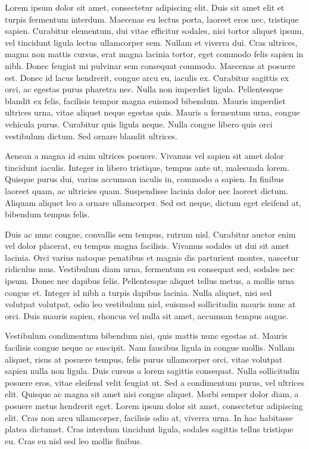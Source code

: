 \documentclass[a4paper,12pt]{report}
\begin{document}
\begin{multicols}{2}
  	\setlength{\columnseprule}{2pt} %
	\setlength{\columnsep}{1cm} %
	\noindent

  Lorem ipsum dolor sit amet, consectetur adipiscing elit. Duis sit amet elit et turpis fermentum interdum. Maecenas eu lectus porta, laoreet eros nec, tristique sapien. Curabitur elementum, dui vitae efficitur sodales, nisi tortor aliquet ipsum, vel tincidunt ligula lectus ullamcorper sem. Nullam et viverra dui. Cras ultrices, magna non mattis cursus, erat magna lacinia tortor, eget commodo felis sapien in nibh. Donec feugiat mi pulvinar sem consequat commodo. Maecenas at posuere est. Donec id lacus hendrerit, congue arcu eu, iaculis ex. Curabitur sagittis ex orci, ac egestas purus pharetra nec. Nulla non imperdiet ligula. Pellentesque blandit ex felis, facilisis tempor magna euismod bibendum. Mauris imperdiet ultrices urna, vitae aliquet neque egestas quis. Mauris a fermentum urna, congue vehicula purus. Curabitur quis ligula neque. Nulla congue libero quis orci vestibulum dictum. Sed ornare blandit ultrices.

  Aenean a magna id enim ultrices posuere. Vivamus vel sapien sit amet dolor tincidunt iaculis. Integer in libero tristique, tempus ante ut, malesuada lorem. Quisque purus dui, varius accumsan iaculis in, commodo a sapien. In finibus laoreet quam, ac ultricies quam. Suspendisse lacinia dolor nec laoreet dictum. Aliquam aliquet leo a ornare ullamcorper. Sed est neque, dictum eget eleifend at, bibendum tempus felis.


Duis ac nunc congue, convallis sem tempus, rutrum nisl. Curabitur auctor enim vel dolor placerat, eu tempus magna facilisis. Vivamus sodales ut dui sit amet lacinia. Orci varius natoque penatibus et magnis dis parturient montes, nascetur ridiculus mus. Vestibulum diam urna, fermentum eu consequat sed, sodales nec ipsum. Donec nec dapibus felis. Pellentesque aliquet tellus metus, a mollis urna congue et. Integer id nibh a turpis dapibus lacinia. Nulla aliquet, nisi sed volutpat volutpat, odio leo vestibulum nisl, euismod sollicitudin mauris nunc at orci. Duis mauris sapien, rhoncus vel nulla sit amet, accumsan tempus augue.

\end{multicols}

    Vestibulum condimentum bibendum nisi, quis mattis nunc egestas at. Mauris facilisis congue neque ac suscipit. Nam faucibus ligula in congue mollis. Nullam aliquet, risus at posuere tempus, felis purus ullamcorper orci, vitae volutpat sapien nulla non ligula. Duis cursus a lorem sagittis consequat. Nulla sollicitudin posuere eros, vitae eleifend velit feugiat ut. Sed a condimentum purus, vel ultrices elit. Quisque ac magna sit amet nisi congue aliquet. Morbi semper dolor diam, a posuere metus hendrerit eget. Lorem ipsum dolor sit amet, consectetur adipiscing elit. Cras non arcu ullamcorper, facilisis odio at, viverra urna. In hac habitasse platea dictumst. Cras interdum tincidunt ligula, sodales sagittis tellus tristique eu. Cras eu nisl sed leo mollis finibus.
\end{document}
